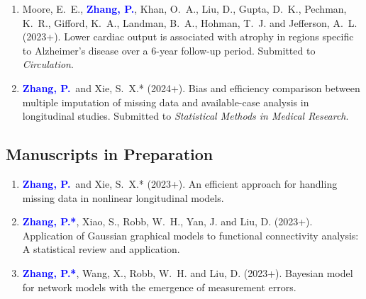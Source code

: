 \documentclass[12pt]{article}
\newcommand{\PZ}{\textcolor{blue}{\textbf{Zhang, P.*}}}
\newcommand{\PZnot}{\textcolor{blue}{\textbf{Zhang, P.}}}
\begin{document}
\begin{enumerate}
		\item {\sc Moore, E.\ E.,} \PZnot, {\sc Khan, O.\ A., Liu, 
		D., Gupta, D.\ K., Pechman, K.\ R., Gifford, K.\ A., 
		Landman, B.\ A., Hohman, T.\ J.} and {\sc Jefferson, A.\ 
		L.} (2023+). Lower cardiac output is associated with atrophy 
		in regions specific to Alzheimer’s disease over a 6-year 
		follow-up period. Submitted to {\em Circulation}.
		
		\item \PZnot\ and {\sc Xie, S.\ X.*} (2024+). Bias 
		and efficiency comparison between multiple imputation of 
		missing data and available-case analysis in longitudinal 
		studies. Submitted to {\em Statistical Methods in Medical 
		Research}.
	\end{enumerate}
	
	\subsection*{Manuscripts in Preparation}
	\begin{enumerate}
		\item \PZnot\ and {\sc Xie, S.\ X.*} (2023+). An efficient 
		approach for handling missing data in nonlinear longitudinal
		models.	
		
		\item \PZ, {\sc Xiao, S., Robb, W.\ H., Yan, J.} and {\sc 
		Liu, D.} (2023+).
		Application of Gaussian graphical models to functional 
		connectivity analysis: A statistical review and application.
		
		\item \PZ, {\sc Wang, X., Robb, W.\ H.} and {\sc Liu, D.} 
		(2023+). Bayesian model for network models with the 
		emergence of measurement errors.
	\end{enumerate}
	
\end{document}
